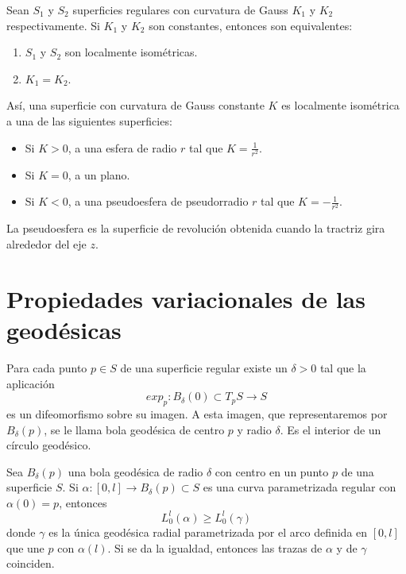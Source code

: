\begin{corollary}
    Sean $S_1$ y $S_2$ superficies regulares con curvatura de Gauss $K_1$ y $K_2$ respectivamente.
    Si $K_1$ y $K_2$ son constantes, entonces son equivalentes:
    \begin{enumerate}
        \item $S_1$ y $S_2$ son localmente isométricas.
        \item $K_1 = K_2$.
    \end{enumerate}
    Así, una superficie con curvatura de Gauss constante $K$ es localmente isométrica a una de las siguientes superficies:
    \begin{itemize}
        \item Si $K>0$, a una esfera de radio $r$ tal que $K = \frac{1}{r^2}$.
        \item Si $K=0$, a un plano.
        \item Si $K<0$, a una pseudoesfera de pseudorradio $r$ tal que $K = -\frac{1}{r^2}$.
    \end{itemize}
\end{corollary}

\begin{note}
    La pseudoesfera es la superficie de revolución obtenida cuando la tractriz gira alrededor del eje $z$.
\end{note}

\section{Propiedades variacionales de las geodésicas}

\begin{definition}
    Para cada punto $p \in S$ de una superficie regular existe un $\delta>0$ tal que la aplicación $$exp_p : B_\delta(0) \subset T_pS \to S$$ es un difeomorfismo sobre su imagen.
    A esta imagen, que representaremos por $B_\delta(p)$, se le llama bola geodésica de centro $p$ y radio $\delta$.
    Es el interior de un círculo geodésico.
\end{definition}

\begin{proposition}
    Sea $B_\delta(p)$ una bola geodésica de radio $\delta$ con centro en un punto $p$ de una superficie $S$.
    Si $\alpha : [0, l] \to B_\delta(p) \subset S$ es una curva parametrizada regular con $\alpha(0) = p$, entonces
    $$L^l_0(\alpha) \geq L^l_0(\gamma)$$
    donde $\gamma$ es la única geodésica radial parametrizada por el arco definida en $[0, l]$ que une $p$ con $\alpha(l)$.
    Si se da la igualdad, entonces las trazas de $\alpha$ y de $\gamma$ coinciden.
\end{proposition}

